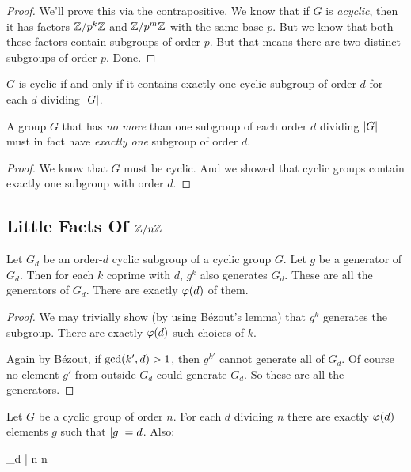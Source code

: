 \begin{proof}
  We'll prove this via the contrapositive. We know that if $G$ is
  \emph{acyclic}, then it has factors $\mathbb{Z} / p^k\mathbb{Z}$ and $\mathbb{Z} / p^m\mathbb{Z}$ with
  the same base $p$. But we know that both these factors contain
  subgroups of order $p$. But that means there are two distinct
  subgroups of order $p$. Done.
\end{proof}

\begin{theorem}
  $G$ is cyclic if and only if it contains exactly one cyclic subgroup
  of order $d$ for each $d$ dividing $|G|$.
\end{theorem}

\begin{corollary}
  A group $G$ that has \emph{no more} than one subgroup of each order
  $d$ dividing $|G|$ must in fact have \emph{exactly one} subgroup
  of order $d$.
\end{corollary}

\begin{proof}
  We know that $G$ must be cyclic. And we showed that cyclic groups
  contain exactly one subgroup with order $d$.
\end{proof}

\subsection{Little Facts Of $\mathbb{Z} / n\mathbb{Z}$}

\begin{proposition}
  Let $G_d$ be an order-$d$ cyclic subgroup of a cyclic group $G$. Let
  $g$ be a generator of $G_d$. Then for each $k$ coprime with $d$, $g^k$
  also generates $G_d$. These are all the generators of $G_d$. There are
  exactly $\varphi\mathopen{}\left( {d} \right)\mathclose{}$ of them.
\end{proposition}

\begin{proof}
  We may trivially show (by using Bézout's lemma) that $g^k$ generates
  the subgroup. There are exactly $\varphi\mathopen{}\left( {d} \right)\mathclose{}$ such choices of $k$.

  Again by Bézout, if $\gcd\mathopen{}\left( {k', d} \right)\mathclose{} > 1$, then $g^{k'}$ cannot generate
  all of $G_d$. Of course no element $g'$ from outside $G_d$ could
  generate $G_d$. So these are all the generators.
\end{proof}

\begin{corollary}
  Let $G$ be a cyclic group of order $n$. For each $d$ dividing $n$
  there are exactly $\varphi\mathopen{}\left( {d} \right)\mathclose{}$ elements $g$ such that $|g| = d$.
  Also:

  \begin{nedqn}
    \sum_{d | n} 
  \eqcol
    n
  \end{nedqn}
\end{corollary}

